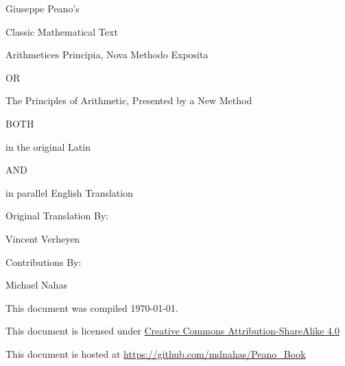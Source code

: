 \documentclass{book}
\begin{document}
 




%
{ \centering

  \vspace*{1cm}
  
  {\Large Giuseppe Peano's}

  {\normalsize Classic Mathematical Text}

  \vspace{1cm}

  {\Huge Arithmetices Principia, Nova Methodo Exposita}

  \vspace{0.5cm}

  {\Large OR}

  \vspace{0.5cm}

  {\Huge The Principles of Arithmetic, Presented by a New Method}

  \vspace{1cm}

  BOTH %

  {\Large in the original Latin}

  AND

  {\Large in parallel English Translation}

  \vspace{1cm}

  Original Translation By:

  {\Large Vincent Verheyen}

  \vspace{1cm}

  Contributions By:

  Michael Nahas

  \vfill

  
  \normalsize This document was compiled \today.

  \normalsize This document is licensed under \href{http://creativecommons.org/licenses/by-sa/4.0/}{Creative Commons Attribution-ShareAlike 4.0}

  \normalsize This document is hosted at \url{https://github.com/mdnahas/Peano_Book}

} %
\newpage  
\end{document}
